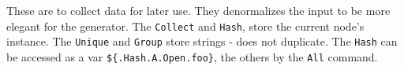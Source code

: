 These are to collect data for later use. They denormalizes the input to
be more elegant for the generator. The \texttt{Collect} and
\texttt{Hash}, store the current node's instance. The \texttt{Unique}
and \texttt{Group} store strings - does not duplicate. The \texttt{Hash}
can be accessed as a var \texttt{\$\{.Hash.A.Open.foo\}}, the others by
the \texttt{All} command.
